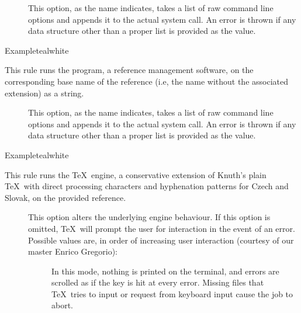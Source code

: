 \begin{description}
\begin{description}
\item[] This option, as the name indicates, takes a list of raw command line options and appends it to the actual system call. An error is thrown if any data structure other than a proper list is provided as the value.
\end{description}

\begin{codebox}{Example}{teal}{\icnote}{white}
\end{codebox}

\item[\rulebox{pbibtex}]
This rule runs the  program, a reference management software, on the corresponding base name of the  reference (i.e, the name without the associated extension) as a string.

\begin{description}
\item[] This option, as the name indicates, takes a list of raw command line options and appends it to the actual system call. An error is thrown if any data structure other than a proper list is provided as the value.
\end{description}

\begin{codebox}{Example}{teal}{\icnote}{white}
\end{codebox}

\item[\rulebox{pdfcsplain}]
This rule runs the  \TeX\ engine, a conservative extension of Knuth's plain \TeX\ with direct processing characters and hyphenation patterns for Czech and Slovak, on the provided  reference.

\begin{description}
\item[] This option alters the underlying engine behaviour. If this option is omitted, \TeX\ will prompt the user for interaction in the event of an error. Possible values are, in order of increasing user interaction (courtesy of our master Enrico Gregorio):

\begin{description}
\item[] In this mode, nothing is printed on the terminal, and errors are scrolled as if the  key is hit at every error. Missing files that \TeX\ tries to input or request from keyboard input cause the job to abort.


\end{description}
\end{description}
\end{description}
